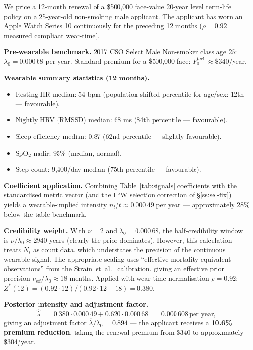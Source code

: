 \begin{ebox}
We price a 12-month renewal of a \$500{,}000 face-value 20-year level
term-life policy on a 25-year-old non-smoking male applicant. The
applicant has worn an Apple Watch Series 10 continuously for the
preceding 12 months ($\rho=0.92$ measured compliant wear-time).

\textbf{Pre-wearable benchmark.} 2017 CSO Select Male Non-smoker
class age 25: $\lambda_0 = 0.000\,68$ per year. Standard premium for
a \$500{,}000 face: $P^{\mathrm{tech}}_0 \approx \$340$/year.

\textbf{Wearable summary statistics (12 months).}
\begin{itemize}[leftmargin=*,nosep]
   \item Resting HR median: 54 bpm (population-shifted percentile
         for age/sex: 12th --- favourable).
   \item Nightly HRV (RMSSD) median: 68 ms (84th percentile ---
         favourable).
   \item Sleep efficiency median: 0.87 (62nd percentile ---
         slightly favourable).
   \item SpO$_2$ nadir: 95\% (median, normal).
   \item Step count: 9{,}400/day median (75th percentile ---
         favourable).
\end{itemize}

\textbf{Coefficient application.} Combining
Table~\ref{tab:signals} coefficients with the standardised
metric vector (and the IPW selection correction of
\S\ref{ss:sel-fix}) yields a wearable-implied intensity
$n_t/t \approx 0.000\,49$ per year --- approximately 28\% below the
table benchmark.

\textbf{Credibility weight.} With $\nu=2$ and $\lambda_0=0.000\,68$,
the half-credibility window is $\nu/\lambda_0 \approx
2940$ years (clearly the prior dominates). However, this calculation
treats $N_t$ as count data, which understates the precision of the
continuous wearable signal. The appropriate scaling
uses ``effective mortality-equivalent observations'' from the
Strain~et~al.\ \cite{Strain2020} calibration, giving an effective
prior precision $\nu_{\mathrm{eff}}/\lambda_0 \approx 18$ months.
Applied with wear-time normalisation $\rho=0.92$:
$Z^*(12) = (0.92\cdot 12)/(0.92\cdot 12 + 18) = 0.380$.

\textbf{Posterior intensity and adjustment factor.}
\[
   \hat\lambda \;=\; 0.380\cdot 0.000\,49 + 0.620\cdot 0.000\,68
                \;=\; 0.000\,608\,\text{per year},
\]
giving an adjustment factor
$\hat\lambda/\lambda_0 = 0.894$ --- the applicant receives a
\textbf{10.6\% premium reduction}, taking the renewal premium from
\$340 to approximately \$304/year.


\end{ebox}

